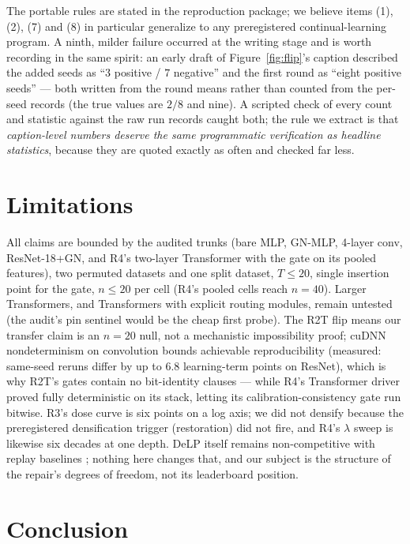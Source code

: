 \documentclass[10pt]{article}
\begin{document}
The portable rules are stated in the reproduction package; we believe items
(1), (2), (7) and (8) in particular generalize to any preregistered
continual-learning program. A ninth, milder failure occurred at the
writing stage and is worth recording in the same spirit: an early draft
of Figure~\ref{fig:flip}'s caption described the added seeds as ``$3$
positive / $7$ negative'' and the first round as ``eight positive
seeds'' --- both written from the round means rather than counted from
the per-seed records (the true values are $2/8$ and nine). A scripted
check of every count and statistic against the raw run records caught
both; the rule we extract is that \emph{caption-level numbers deserve
the same programmatic verification as headline statistics}, because they
are quoted exactly as often and checked far less.

\section{Limitations}
\label{sec:limits}

All claims are bounded by the audited trunks (bare MLP, GN-MLP, 4-layer
conv, ResNet-18+GN, and R4's two-layer Transformer with the gate on its
pooled features), two permuted datasets and one split dataset,
$T\le20$, single insertion point for the gate, $n\le20$ per cell
(R4's pooled cells reach $n{=}40$). Larger Transformers, and Transformers
with explicit routing modules, remain untested (the audit's pin sentinel
would be the cheap first probe). The R2T flip means our transfer
claim is an $n{=}20$ null, not a mechanistic impossibility proof; cuDNN
nondeterminism on convolution bounds achievable reproducibility (measured:
same-seed reruns differ by up to $6.8$ learning-term points on ResNet),
which is why R2T's gates contain no bit-identity clauses --- while R4's
Transformer driver proved fully deterministic on its stack, letting its
calibration-consistency gate run bitwise. R3's dose curve
is six points on a log axis; we did not densify because the preregistered
densification trigger (restoration) did not fire, and R4's $\lambda$
sweep is likewise six decades at one depth. DeLP itself remains
non-competitive with replay baselines \citep{zhou2026delp,zhou2026anchorbudget}; nothing here
changes that, and our subject is the structure of the repair's degrees of
freedom, not its leaderboard position.

\section{Conclusion}
\end{document}
